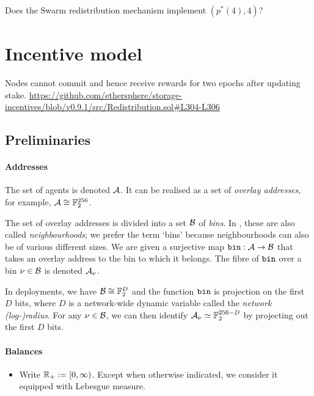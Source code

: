 \begin{question} Does the Swarm redistribution mechanism implement $(p^*(4),4)$? \end{question}



\newpage

\section{Incentive model}

Nodes cannot commit and hence receive rewards for two epochs after updating stake. \url{https://github.com/ethersphere/storage-incentives/blob/v0.9.1/src/Redistribution.sol#L304-L306}

\subsection{Preliminaries}

\paragraph{Addresses}

The set of agents is denoted $\mathcal{A}$.
%
It can be realised as a set of \emph{overlay addresses}, for example, $\mathcal{A} \cong \mathbb{F}_2^{256}$.

The set of overlay addresses is divided into a set $\mathcal{B}$ of \emph{bins}.
%
In \cite{book-of-swarm}, these are also called \emph{neighbourhoods}; we prefer the term `bins' because neighbourhoods can also be of various different sizes.
%
We are given a surjective map $\mathtt{bin}:\mathcal{A}\rightarrow\mathcal{B}$ that takes an overlay address to the bin to which it belongs.
%
The fibre of $\mathtt{bin}$ over a bin $\nu\in\mathcal{B}$ is denoted $\mathcal{A}_\nu$.

In deployments, we have $\mathcal{B}\cong \mathbb{F}_2^D$ and the function $\mathtt{bin}$ is projection on the first $D$ bits, where $D$ is a network-wide dynamic variable called the \emph{network (log-)radius}.
%
For any $\nu\in\mathcal{B}$, we can then identify $\mathcal{A}_\nu\simeq\mathbb{F}_2^{256-D}$ by projecting out the first $D$ bits.


\paragraph{Balances}
\begin{itemize}
  \item 
    Write $\mathbb{R}_+ := [0,\infty)$. Except when otherwise indicated, we consider it equipped with Lebesgue measure.

\end{itemize}

